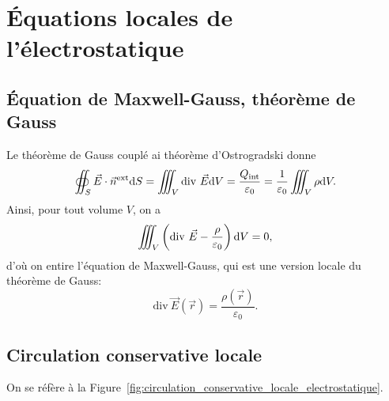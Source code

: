 \section{Équations locales de l'électrostatique}

    \subsection{Équation de Maxwell-Gauss, théorème de Gauss}

        Le théorème de Gauss couplé ai théorème d'Ostrogradski donne
        \begin{equation}
            \oiint_{S}\vec{E}\cdot\vec{n}^{\text{ext}}\mathrm{d} S=\iiint_{V}\mathrm{div}~\vec{E}\mathrm{d} V=\frac{Q_{\text{int}}}{\varepsilon_0}=\frac{1}{\varepsilon_0}\iiint_{V}\rho\mathrm{d} V.
        \end{equation}
        Ainsi, pour tout volume $V$, on a 
        \begin{equation}
            \iiint_{V}\left(
                \mathrm{div}~\vec{E}-\frac{\rho}{\varepsilon_0}
            \right)\mathrm{d} V=0,
        \end{equation}
        d'où on entire l'équation de Maxwell-Gauss, qui est une version locale du théorème de Gauss:
        \begin{equation}
            \boxed{
                \mathrm{div}~\vec{E}(\vec{r})=\frac{\rho(\vec{r})}{\varepsilon_0}.
            }
        \end{equation}

    \subsection{Circulation conservative locale}

        On se réfère à la Figure~\ref{fig:circulation_conservative_locale_electrostatique}.

